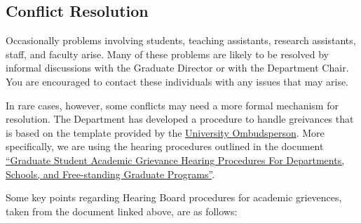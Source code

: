 \subsection{Conflict Resolution}

Occasionally problems involving students, teaching assistants,
research assistants, staff, and faculty arise.  Many of these problems
are likely to be resolved by informal discussions with the Graduate Director or
with the Department Chair.  You are encouraged to contact these
individuals with any issues that may arise.

In rare cases, however, some conflicts may need a more formal mechanism for
resolution.  The Department has developed a procedure to
handle greivances that is based on the template provided by the
\href{https://msu.edu/unit/ombud/grievance-procedures/index.html}{University
  Ombudsperson}.  More specifically, we are using the hearing
procedures outlined in the document \href{https://msu.edu/unit/ombud/grievance-procedures/Graduate\%20Student\%20Hearing\%20Procedures\%20for\%20Departments\%20and\%20Schools\%20Revised\%20Sept\%2018\%202015.pdf}{``Graduate Student Academic Grievance Hearing Procedures
For Departments, Schools, and Free-standing Graduate Programs''}.

Some key points regarding Hearing Board procedures for academic
grievences, taken from the document linked above, are as follows:

